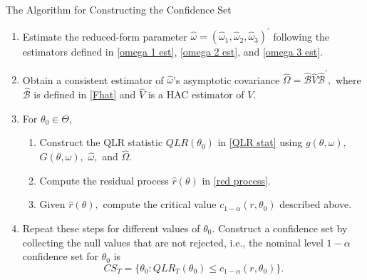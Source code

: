 \documentclass[smaller, aspectratio=169]{beamer}
\begin{document}
\begin{frame}[c]{The Algorithm for Constructing the Confidence Set}
    \begin{enumerate}
        \item Estimate the reduced-form parameter $\widehat{\omega }=( \widehat{\omega }_{1},\widehat{\omega }_{2},\widehat{\omega }_{3})^{\prime }$ following the estimators defined in \ref{omega 1 est}, \ref{omega 2 est}, and  \ref{omega 3 est}.
            \midskip
%
        \item Obtain a consistent estimator of $\widehat{\omega}$'s asymptotic covariance $\widehat{ \Omega }=\widehat{\mathcal{B}}\widehat{V}\widehat{\mathcal{B}}^{\prime },$ where $\widehat{\mathcal{B}}$ is defined in \ref{Fhat} and $\widehat{V}$ is a HAC estimator of $V.$
            \midskip
    
        \item For $\theta _{0}\in \Theta$,
%
        \begin{enumerate}
            \item Construct the QLR statistic $QLR(\theta _{0})$ in \ref{QLR stat} using $g(\theta ,\omega ),$ $G(\theta ,\omega ),$ $\widehat{\omega },$ and $\widehat{\Omega }.$
%
            \item Compute the residual process $\widehat{r}(\theta )$ in \ref{red process}.
    
           \item Given $\widehat{r}(\theta ),$ compute the critical value $c_{1-\alpha }(r,\theta _{0})$ described above.
%
        \end{enumerate}
            \midskip
%
        \item Repeat these steps for different values of $\theta _{0}$.  Construct a confidence set by collecting the null values that are not rejected, i.e., the nominal level $1-\alpha $ confidence set for $\theta _{0}$ is
%
        \begin{equation}
            CS_{T}=\{ \theta _{0}:QLR_{T}(\theta _{0})\leq c_{1-\alpha }(r,\theta_{0})\}.
        \end{equation}
    \end{enumerate}
\end{frame}
\end{document}
